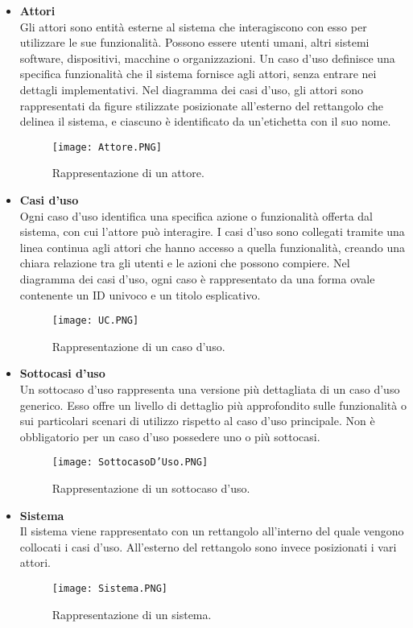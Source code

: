 \begin{itemize}
    \item \textbf{Attori}\\
        Gli attori sono entità esterne al sistema che interagiscono con esso per utilizzare le sue funzionalità. Possono essere utenti umani, altri sistemi software, dispositivi, macchine o organizzazioni. Un caso d'uso definisce una specifica funzionalità che il sistema fornisce agli attori, senza entrare nei dettagli implementativi. Nel diagramma dei casi d'uso, gli attori sono rappresentati da figure stilizzate posizionate all'esterno del rettangolo che delinea il sistema, e ciascuno è identificato da un’etichetta con il suo nome.
        \begin{figure}[H]
        \centering
        \texttt{[image: Attore.PNG]}
        \caption{Rappresentazione di un attore.}
        \end{figure}

        \item \textbf{Casi d'uso}\\
        Ogni caso d’uso identifica una specifica azione o funzionalità offerta dal sistema, con cui l’attore può interagire. I casi d'uso sono collegati tramite una linea continua agli attori che hanno accesso a quella funzionalità, creando una chiara relazione tra gli utenti e le azioni che possono compiere. Nel diagramma dei casi d’uso, ogni caso è rappresentato da una forma ovale contenente un ID univoco e un titolo esplicativo.
        \begin{figure}[H]
        \centering
        \texttt{[image: UC.PNG]}
        \caption{Rappresentazione di un caso d'uso.}
        \end{figure}

        \item \textbf{Sottocasi d'uso}\\
        Un sottocaso d’uso rappresenta una versione più dettagliata di un caso d’uso  generico. Esso offre un livello di dettaglio più approfondito sulle funzionalità o sui particolari scenari di utilizzo rispetto al caso d’uso principale. Non è obbligatorio per un caso d'uso possedere uno o più sottocasi.
        \begin{figure}[H]
        \centering
        \texttt{[image: SottocasoD'Uso.PNG]}
        \caption{Rappresentazione di un sottocaso d'uso.}
        \end{figure}

        \item \textbf{Sistema}\\
         Il sistema viene rappresentato con un rettangolo all'interno del quale vengono collocati i casi d'uso. All'esterno del rettangolo sono invece posizionati i vari attori.
        \begin{figure}[H]
        \centering
        \texttt{[image: Sistema.PNG]}
        \caption{Rappresentazione di un sistema.}
        \end{figure}


\end{itemize}

